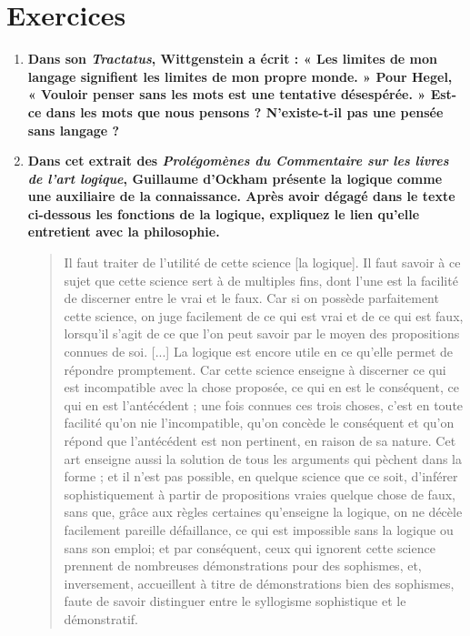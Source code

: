 \section*{Exercices}
{}
\begin{enumerate}[label=\arabic*.,leftmargin=1.6em]
\item \textbf{Dans son \textit{Tractatus}, Wittgenstein a écrit : « Les limites de mon langage signifient les limites de mon propre monde. » Pour Hegel, « Vouloir penser sans les mots est une tentative désespérée. » Est-ce dans les mots que nous pensons ? N’existe-t-il pas une pensée sans langage ?}

\item \textbf{Dans cet extrait des \textit{Prolégomènes du Commentaire sur les livres de l’art logique}, Guillaume d’Ockham présente la logique comme une auxiliaire de la connaissance. Après avoir dégagé dans le texte ci-dessous les fonctions de la logique, expliquez le lien qu’elle entretient avec la philosophie.}
\begin{quote}\small
Il faut traiter de l’utilité de cette science [la logique]. Il faut savoir à ce sujet que cette science sert à de multiples fins, dont l’une est la facilité de discerner entre le vrai et le faux. Car si on possède parfaitement cette science, on juge facilement de ce qui est vrai et de ce qui est faux, lorsqu’il s’agit de ce que l’on peut savoir par le moyen des propositions connues de soi. [...] La logique est encore utile en ce qu’elle permet de répondre promptement. Car cette science enseigne à discerner ce qui est incompatible avec la chose proposée, ce qui en est le conséquent, ce qui en est l’antécédent ; une fois connues ces trois choses, c’est en toute facilité qu’on nie l’incompatible, qu’on concède le conséquent et qu’on répond que l’antécédent est non pertinent, en raison de sa nature. Cet art enseigne aussi la solution de tous les arguments qui pèchent dans la forme ; et il n’est pas possible, en quelque science que ce soit, d’inférer sophistiquement à partir de propositions vraies quelque chose de faux, sans que, grâce aux règles certaines qu’enseigne la logique, on ne décèle facilement pareille défaillance, ce qui est impossible sans la logique ou sans son emploi; et par conséquent, ceux qui ignorent cette science prennent de nombreuses démonstrations pour des sophismes, et, inversement, accueillent à titre de démonstrations bien des sophismes, faute de savoir distinguer entre le syllogisme sophistique et le démonstratif.
\end{quote}


\end{enumerate}
